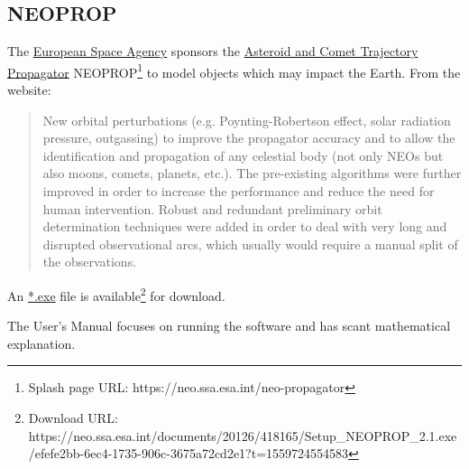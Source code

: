 \documentclass[a4paper,10pt]{article}
\begin{document}
\subsection{NEOPROP}
The \href{https://neo.ssa.esa.int/}{European Space Agency} sponsors the \href{https://neo.ssa.esa.int/neo-propagator}{Asteroid and Comet Trajectory Propagator} NEOPROP\footnote{Splash page URL: https://neo.ssa.esa.int/neo-propagator} to model objects which may impact the Earth.
From the website:
\begin{quotation}
New orbital perturbations (e.g. Poynting-Robertson effect, solar radiation pressure, outgassing) to improve the propagator accuracy and to allow the identification and propagation of any celestial body (not only NEOs but also moons, comets, planets, etc.).
The pre-existing algorithms were further improved in order to increase the performance and reduce the need for human intervention. Robust and redundant preliminary orbit determination techniques were added in order to deal with very long and disrupted observational arcs, which usually would require a manual split of the observations. 
\end{quotation}

An \href{https://neo.ssa.esa.int/documents/20126/418165/Setup\_NEOPROP\_2.1.exe/efefe2bb-6ec4-1735-906c-3675a72cd2e1?t=1559724554583}{*.exe} file is available\footnote{Download URL: https://neo.ssa.esa.int/documents/20126/418165/Setup\_NEOPROP\_2.1.exe/efefe2bb-6ec4-1735-906c-3675a72cd2e1?t=1559724554583} for download.

The User's Manual focuses on running the software and has scant mathematical explanation.

\end{document}
